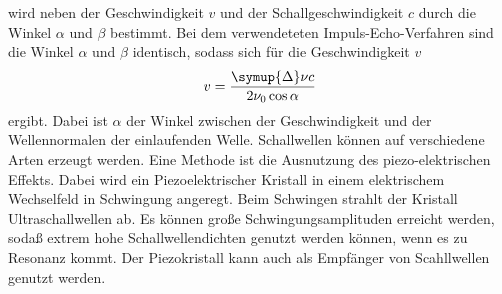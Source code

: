 wird neben der Geschwindigkeit $v$ und der Schallgeschwindigkeit $c$ durch die Winkel $\alpha$ und $\beta$ bestimmt. Bei dem verwendeteten Impuls-Echo-Verfahren sind die Winkel $\alpha$ und $\beta$ identisch,
sodass sich für die Geschwindigkeit $v$
\begin{equation}
    v= \frac{\symup{\Delta}\nu c}{2 \nu_0 \cos \alpha}
    \label{eqn:geschw}
\end{equation}
ergibt. Dabei ist $\alpha$ der Winkel zwischen der Geschwindigkeit und der Wellennormalen der einlaufenden Welle. Schallwellen können auf verschiedene Arten erzeugt werden.
Eine Methode ist die Ausnutzung des piezo-elektrischen Effekts. Dabei wird ein Piezoelektrischer Kristall in einem elektrischem Wechselfeld in Schwingung angeregt.
Beim Schwingen strahlt der Kristall Ultraschallwellen ab. Es können große Schwingungsamplituden erreicht werden, sodaß extrem hohe Schallwellendichten genutzt werden können, wenn es zu Resonanz kommt.
Der Piezokristall kann auch als Empfänger von Scahllwellen genutzt werden.
